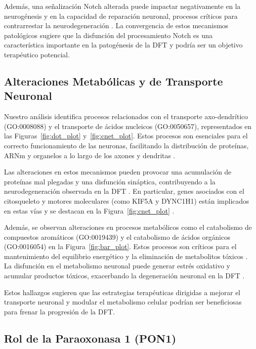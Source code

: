 Además, una señalización Notch alterada puede impactar negativamente en la neurogénesis y en la capacidad de reparación neuronal, procesos críticos para contrarrestar la neurodegeneración \cite{ables2011notch}. La convergencia de estos mecanismos patológicos sugiere que la disfunción del procesamiento Notch es una característica importante en la patogénesis de la DFT y podría ser un objetivo terapéutico potencial.


\subsection{Alteraciones Metabólicas y de Transporte Neuronal}

Nuestro análisis identifica procesos relacionados con el transporte axo-dendrítico (GO:0008088) y el transporte de ácidos nucleicos (GO:0050657), representados en las Figuras~\ref{fig:dot_plot} y~\ref{fig:cnet_plot}. Estos procesos son esenciales para el correcto funcionamiento de las neuronas, facilitando la distribución de proteínas, ARNm y organelos a lo largo de los axones y dendritas \cite{goldstein2001axonal}.

Las alteraciones en estos mecanismos pueden provocar una acumulación de proteínas mal plegadas y una disfunción sináptica, contribuyendo a la neurodegeneración observada en la DFT \cite{moreno2016axonal}. En particular, genes asociados con el citosqueleto y motores moleculares (como KIF5A y DYNC1H1) están implicados en estas vías y se destacan en la Figura~\ref{fig:cnet_plot} \cite{reid2019kif5a}.

Además, se observan alteraciones en procesos metabólicos como el catabolismo de compuestos aromáticos (GO:0019439) y el catabolismo de ácidos orgánicos (GO:0016054) en la Figura~\ref{fig:bar_plot}. Estos procesos son críticos para el mantenimiento del equilibrio energético y la eliminación de metabolitos tóxicos \cite{mccabe2001metabolism}. La disfunción en el metabolismo neuronal puede generar estrés oxidativo y acumular productos tóxicos, exacerbando la degeneración neuronal en la DFT \cite{seelaar2011clinical}.

Estos hallazgos sugieren que las estrategias terapéuticas dirigidas a mejorar el transporte neuronal y modular el metabolismo celular podrían ser beneficiosas para frenar la progresión de la DFT.


\subsection{Rol de la Paraoxonasa 1 (PON1)}

